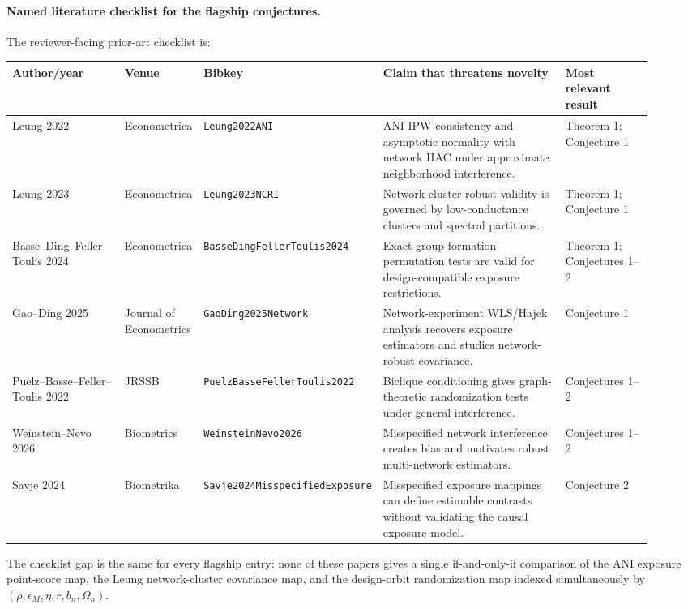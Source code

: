 \documentclass[11pt]{article}
\theoremstyle{definition}
\theoremstyle{plain}
\theoremstyle{remark}
\begin{document}
\paragraph{Named literature checklist for the flagship conjectures.}
The reviewer-facing prior-art checklist is:
\begin{center}
\small
\begin{tabular}{p{0.18\linewidth}p{0.10\linewidth}p{0.20\linewidth}p{0.30\linewidth}p{0.14\linewidth}}
Author/year & Venue & Bibkey & Claim that threatens novelty & Most relevant result\\
\hline
Leung 2022 & Econometrica & \texttt{Leung2022ANI} &
ANI IPW consistency and asymptotic normality with network HAC under approximate neighborhood interference. &
Theorem 1; Conjecture 1\\
Leung 2023 & Econometrica & \texttt{Leung2023NCRI} &
Network cluster-robust validity is governed by low-conductance clusters and spectral partitions. &
Theorem 1; Conjecture 1\\
Basse--Ding--Feller--Toulis 2024 & Econometrica & \texttt{BasseDingFellerToulis2024} &
Exact group-formation permutation tests are valid for design-compatible exposure restrictions. &
Theorem 1; Conjectures 1--2\\
Gao--Ding 2025 & Journal of Econometrics & \texttt{GaoDing2025Network} &
Network-experiment WLS/Hajek analysis recovers exposure estimators and studies network-robust covariance. &
Conjecture 1\\
Puelz--Basse--Feller--Toulis 2022 & JRSSB & \texttt{PuelzBasseFellerToulis2022} &
Biclique conditioning gives graph-theoretic randomization tests under general interference. &
Conjectures 1--2\\
Weinstein--Nevo 2026 & Biometrics & \texttt{WeinsteinNevo2026} &
Misspecified network interference creates bias and motivates robust multi-network estimators. &
Conjectures 1--2\\
Savje 2024 & Biometrika & \texttt{Savje2024MisspecifiedExposure} &
Misspecified exposure mappings can define estimable contrasts without validating the causal exposure model. &
Conjecture 2
\end{tabular}
\end{center}
The checklist gap is the same for every flagship entry: none of these papers
gives a single if-and-only-if comparison of the ANI exposure point-score map,
the Leung network-cluster covariance map, and the design-orbit randomization
map indexed simultaneously by \((\rho,\epsilon_M,\eta,r,b_n,\Omega_n)\).
\end{document}

